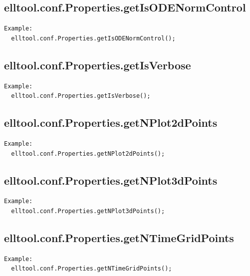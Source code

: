 \documentclass[letterpaper,10pt,english]{sphinxmanual}
\begin{document}
\subsection{elltool.conf.Properties.getIsODENormControl}
\label{chap_functions:elltool-conf-properties-getisodenormcontrol}
\begin{Verbatim}[commandchars=\\\{\}]
Example:
  elltool.conf.Properties.getIsODENormControl();
\end{Verbatim}


\subsection{elltool.conf.Properties.getIsVerbose}
\label{chap_functions:elltool-conf-properties-getisverbose}
\begin{Verbatim}[commandchars=\\\{\}]
Example:
  elltool.conf.Properties.getIsVerbose();
\end{Verbatim}


\subsection{elltool.conf.Properties.getNPlot2dPoints}
\label{chap_functions:elltool-conf-properties-getnplot2dpoints}
\begin{Verbatim}[commandchars=\\\{\}]
Example:
  elltool.conf.Properties.getNPlot2dPoints();
\end{Verbatim}


\subsection{elltool.conf.Properties.getNPlot3dPoints}
\label{chap_functions:elltool-conf-properties-getnplot3dpoints}
\begin{Verbatim}[commandchars=\\\{\}]
Example:
  elltool.conf.Properties.getNPlot3dPoints();
\end{Verbatim}


\subsection{elltool.conf.Properties.getNTimeGridPoints}
\label{chap_functions:elltool-conf-properties-getntimegridpoints}
\begin{Verbatim}[commandchars=\\\{\}]
Example:
  elltool.conf.Properties.getNTimeGridPoints();
\end{Verbatim}
\end{document}
